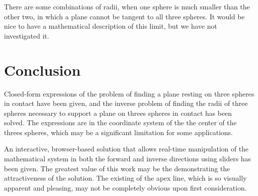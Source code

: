 \documentclass{article}
\begin{document}
There are some combinations of radii, when one sphere is much smaller than the
other two, in which a plane cannot be tangent to all three spheres.
It would be nice to have a mathematical description of this limit,
but we have not investigated it.

\section{Conclusion}

Closed-form expressions of the problem of finding a plane resting on
three spheres in contact have been given, and the inverse problem
of finding the radii of three spheres necessary to support a plane
on threes spheres in contact has been solved.
The expressions are in the coordinate system of the the center
of the threes spheres, which may be a significant limitation for some
applications.

An interactive, browser-based solution that allows real-time manipulation
of the mathematical system in both the forward and inverse directions
using sliders has been given\cite{softrobotcalc}. The greatest value of this work
may be the demonstrating the attractiveness of the solution.
The existing of the apex line, which is so visually apparent and pleasing,
may not be completely obvious upon first consideration.

\printbibliography
\end{document}

